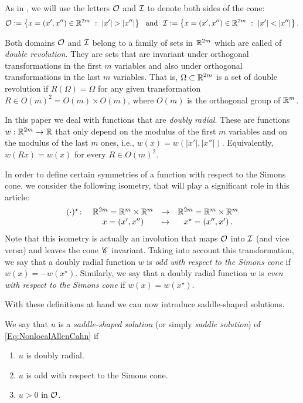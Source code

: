 As in \cite{FelipeSanz-Perela:IntegroDifferentialI}, we will use the letters $\mathcal{O}$ and $\mathcal{I}$ to denote both sides of the cone:
$$
\mathcal{O}:= \left \{ x = (x', x'') \in \mathbb{R}^{2m} \ : \ |x'| > |x''| \right \} \ \textrm{ and } \
\mathcal{I}:= \left \{ x = (x', x'') \in \mathbb{R}^{2m} \ : \ |x'| < |x''| \right \}.
$$



Both domains $\mathcal{O}$ and $\mathcal{I}$ belong to a family of sets in $\mathbb{R}^{2m}$ which are called of \emph{double revolution}. They are sets that are invariant under orthogonal transformations in the first $m$ variables and also under orthogonal transformations in the last $m$ variables. That is, $\Omega\subset \mathbb{R}^{2m}$ is a set of double revolution if $R(\Omega) = \Omega$ for any given transformation $R\in O(m)^2 = O(m) \times O(m)$, where  $O(m)$ is the orthogonal group of $\mathbb{R}^m$.

In this paper we deal with functions that are \emph{doubly radial}. These are functions $w:\mathbb{R}^{2m}  \to \mathbb{R}$ that only depend on the modulus of the first $m$ variables and on the modulus of the last $m$ ones, i.e., $w(x) = w(|x'|,|x''|)$. Equivalently, $w(Rx) = w(x)$ for every $R \in O(m)^2$.

In order to define certain symmetries of a function with respect to the Simons cone, we consider the following isometry, that will play a significant role in this article:
\begin{equation}
\label{Eq:DefStar}
\begin{matrix}
(\cdot)^\star \colon & \mathbb{R}^{2m}= \mathbb{R}^{m}\times \mathbb{R}^{m}  &\to&  \mathbb{R}^{2m}= \mathbb{R}^{m}\times \mathbb{R}^{m}  \\
& x = (x',x'') &\mapsto & x^\star = (x'',x')\,.
\end{matrix}
\end{equation}
Note that this isometry is actually an involution that maps $\mathcal{O}$ into $\mathcal{I}$ (and vice versa) and leaves the cone $\mathscr{C}$ invariant. Taking into account this transformation, we say that a doubly radial function $w$ is \emph{odd with respect to the Simons cone} if $w(x) = -w(x^\star)$. Similarly, we say that a doubly radial function $w$ is \emph{even with respect to the Simons cone} if $w(x) = w(x^\star)$.


With these definitions at hand we can now introduce saddle-shaped solutions.
\begin{definition}
	\label{Def:SaddleShapedSol}
	We say that $u$ is a \emph{saddle-shaped solution} (or simply \emph{saddle solution}) of \eqref{Eq:NonlocalAllenCahn} if
	\begin{enumerate}
		\item $u$ is doubly radial.
		\item $u$ is odd with respect to the Simons cone.
		\item $u > 0$ in $\mathcal{O}$.
	\end{enumerate}
\end{definition}


